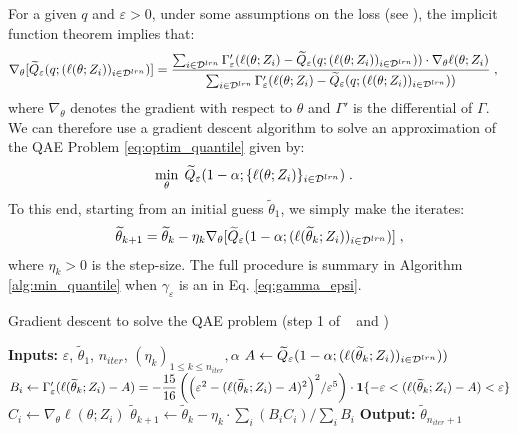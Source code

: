 For a given $q$ and $\varepsilon > 0$, under some assumptions on the loss (see \citet{pena2020solving}), the implicit function theorem implies that:
%
\begin{align}\label{eq:grad_epsi}
	\nabla_{\theta} [\widetilde{Q}_{\varepsilon}(q; (\ell(\theta;Z_i))_{i\in{\cal D}^{lrn}})] &= \dfrac{\sum_{i\in{\cal D}^{lrn}} \Gamma'_{\varepsilon}(\ell(\theta;Z_i) - \widetilde{Q}_{\varepsilon}(q; (\ell(\theta;Z_i))_{i\in{\cal D}^{lrn}})) \cdot \nabla_{\theta} \ell(\theta;Z_i)}{\sum_{i\in{\cal D}^{lrn}} \Gamma'_{\varepsilon}(\ell(\theta;Z_i) - \widetilde{Q}_{\varepsilon}(q; (\ell(\theta;Z_i))_{i\in{\cal D}^{lrn}}))} \; ,
\end{align}
%
where $\nabla_{\theta}$ denotes the gradient with respect to $\theta$ and $\Gamma'$ is the differential of $\Gamma$. We can therefore use a gradient descent algorithm to solve an approximation of the QAE Problem \eqref{eq:optim_quantile} given by:
%
\begin{align*}
	&\min_{\theta} \; \widetilde{Q}_{\varepsilon}(1-\alpha;\{\ell(\theta;Z_i)\}_{i\in{\cal D}^{lrn}}) \; .
\end{align*}
%
To this end, starting from an initial guess $\widetilde{\theta}_1$, we simply make the iterates:
%
\begin{align*}
	\widetilde{\theta}_{k+1} = \widetilde{\theta}_{k} - \eta_k \nabla_{\theta} [\widetilde{Q}_{\varepsilon}(1-\alpha; (\ell(\widetilde{\theta}_k;Z_i))_{i\in{\cal D}^{lrn}})] \; ,
\end{align*}
where $\eta_k > 0$ is the step-size. The full procedure is summary in Algorithm \ref{alg:min_quantile} when $\gamma_{\varepsilon}$ is an in Eq. \eqref{eq:gamma_epsi}.
\begin{algorithm}
	\caption{Gradient descent to solve the QAE problem (step 1 of \method~ and \methodAD)}
	\label{alg:min_quantile}
	\begin{algorithmic}[1]
				\State \textbf{Inputs:} $\varepsilon$, $\widetilde{\theta}_1$, $n_{iter}$, $(\eta_k)_{1 \leq k \leq n_{iter}}, \alpha$
				\State $A \gets \widetilde{Q}_{\varepsilon}(1-\alpha; (\ell(\widetilde{\theta}_k;Z_i))_{i\in{\cal D}^{lrn}}))$
				\State $B_i \gets \Gamma'_{\varepsilon}(\ell(\widetilde{\theta}_{k};Z_i) - A) = -\dfrac{15}{16}\left(\Big(\varepsilon^2 - (\ell(\widetilde{\theta}_{k};Z_i) - A)^2\Big)^2/\varepsilon^5\right) \cdot \mathbf{1}\{-\varepsilon < (\ell(\widetilde{\theta}_{k};Z_i) - A) < \varepsilon\}$
				\State $C_i \gets \nabla_{\theta} \ell(\theta;Z_i)$
				\EndFor
				\State $\widetilde{\theta}_{k+1} \gets \widetilde{\theta}_{k} - \eta_k \cdot \sum_{i} (B_i C_i) / \sum_{i} B_i$
				\EndFor
				\State \textbf{Output:} $\widetilde{\theta}_{n_{iter}+1}$
			\end{algorithmic}
\end{algorithm}

